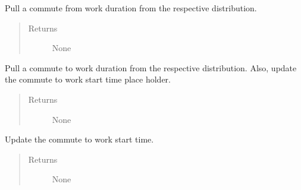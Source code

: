 \documentclass[letterpaper,10pt,english]{sphinxmanual}
\begin{document}
\begin{fulllineitems}
\begin{fulllineitems}
\begin{quote}
\begin{description}
\end{description}\end{quote}

\end{fulllineitems}


\begin{fulllineitems}
\label{occupation:occupation.Occupation.update_commute_from_work_dt}
Pull a commute from work duration from the respective distribution.
\begin{quote}\begin{description}
\item[{Returns}] \leavevmode
None

\end{description}\end{quote}

\end{fulllineitems}


\begin{fulllineitems}
\label{occupation:occupation.Occupation.update_commute_to_work_dt}
Pull a commute to work duration from the respective distribution. Also, update the commute to work         start time place holder.
\begin{quote}\begin{description}
\item[{Returns}] \leavevmode
None

\end{description}\end{quote}

\end{fulllineitems}


\begin{fulllineitems}
\label{occupation:occupation.Occupation.update_commute_to_work_start}
Update the commute to work start time.
\begin{quote}\begin{description}
\item[{Returns}] \leavevmode
None


\end{description}
\end{quote}
\end{fulllineitems}
\end{fulllineitems}
\end{document}

